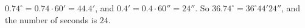 $0.74^\circ=0.74\cdot60'=44.4'$, and $0.4'=0.4\cdot60''=24''$. So $36.74^\circ=36^\circ44'24''$, and the number of seconds is $\boxed{24}$.
